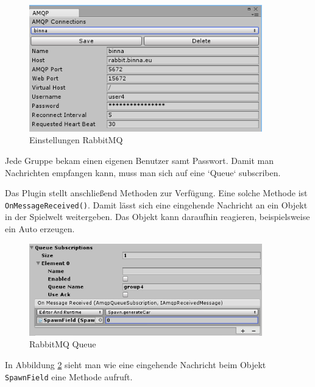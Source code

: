 \begin{figure}[H]
\begin{center}
	\includegraphics[width=0.9\textwidth]{BilderAllgemein/rabbitconfig.png}
\end{center}

	\caption{Einstellungen RabbitMQ}

	\label{img:rabbit}
\end{figure}

Jede Gruppe bekam einen eigenen Benutzer samt Passwort. Damit man Nachrichten empfangen kann, muss man sich auf eine `Queue` subscriben.

Das Plugin stellt anschließend Methoden zur Verfügung. Eine solche Methode ist \texttt{OnMessageReceived()}. Damit lässt sich eine eingehende Nachricht an ein Objekt in der Spielwelt weitergeben. Das Objekt kann daraufhin reagieren, beispielsweise ein Auto erzeugen.

\begin{figure}[H]
\begin{center}
	\includegraphics[width=0.9\textwidth]{BilderAllgemein/rabbitqueue.png}
\end{center}

	\caption{RabbitMQ Queue}

	\label{img:rabbitq}
\end{figure}

In Abbildung \ref{img:rabbitq} sieht man wie eine eingehende Nachricht beim Objekt \texttt{SpawnField} eine Methode aufruft.